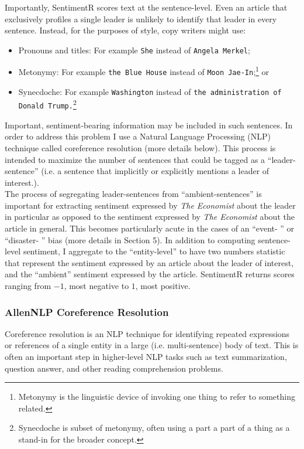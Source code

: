\documentclass[11pt, letterpaper, twoside]{article}
\begin{document}
    Importantly, SentimentR scores text at the sentence-level. Even an article that exclusively profiles a single leader is unlikely to identify that leader in every sentence. Instead, for the purposes of style, copy writers might use:
    \begin{itemize}
        \item Pronouns and titles: For example \verb|She| instead of \verb|Angela Merkel|;
        \item Metonymy: For example \verb|the Blue House| instead of \verb|Moon Jae-In|;\footnote{Metonymy is the linguistic device of invoking one thing to refer to something related.} or
        \item Synecdoche: For example \verb|Washington| instead of \verb|the administration of Donald Trump.|\footnote{Synecdoche is subset of metonymy, often using a part a part of a thing as a stand-in for the broader concept.}
    \end{itemize}
    Important, sentiment-bearing information may be included in such sentences. In order to address this problem I use a Natural Language Processing (NLP) technique called coreference resolution (more details below). This process is intended to maximize the number of sentences that could be tagged as a ``leader-sentence'' (i.e. a sentence that implicitly or explicitly mentions a leader of interest.).\\

    The process of segregating leader-sentences from ``ambient-sentences'' is important for extracting sentiment expressed by \textit{The Economist} about the leader in particular as opposed to the sentiment expressed by \textit{The Economist} about the article in general. This becomes particularly acute in the cases of an ``event- '' or ``disaster- '' bias (more details in Section 5). In addition to computing sentence-level sentiment, I aggregate to the ``entity-level'' to have two numbers statistic that represent the sentiment expressed by an article about the leader of interest, and the ``ambient'' sentiment expressed by the article. SentimentR returns scores ranging from $-1$, most negative to $1$, most positive.

    \subsubsection{AllenNLP Coreference Resolution}
    Coreference resolution is an NLP technique for identifying repeated expressions or references of a single entity in a large (i.e. multi-sentence) body of text. This is often an important step in higher-level NLP tasks such as text summarization, question answer, and other reading comprehension problems.\\
\end{document}
